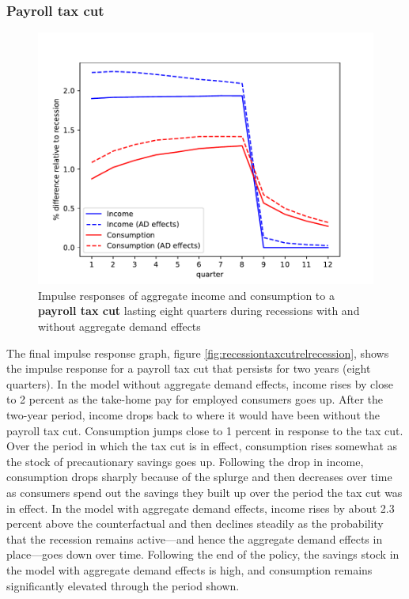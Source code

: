 \documentclass[\econtexRoot/HAFiscal]{subfiles}
\begin{document}
\subsubsection{Payroll tax cut}

\begin{figure}
  \centering
  \includegraphics[width=0.8\linewidth]{Code/HA-Models/FromPandemicCode/Figures/recession_taxcut_relrecession}
  \caption{Impulse responses of aggregate income and consumption to a \textbf{payroll tax cut} lasting eight quarters during recessions with and without aggregate demand effects}
  \notinsubfile{\label{fig:recessiontaxcutrelrecession}}
\end{figure}

The final impulse response graph, figure \ref{fig:recessiontaxcutrelrecession}, shows the impulse response for a payroll tax cut that persists for two years (eight quarters). In the model without aggregate demand effects, income rises by close to 2 percent as the take-home pay for employed consumers goes up. After the two-year period, income drops back to where it would have been without the payroll tax cut. Consumption jumps close to 1 percent in response to the tax cut. Over the period in which the tax cut is in effect, consumption rises somewhat as the stock of precautionary savings goes up. Following the drop in income, consumption drops sharply because of the splurge and then decreases over time as consumers spend out the savings they built up over the period the tax cut was in effect. In the model with aggregate demand effects, income rises by about 2.3 percent above the counterfactual and then declines steadily as the probability that the recession remains active---and hence the aggregate demand effects in place---goes down over time. Following the end of the policy, the savings stock in the model with aggregate demand effects is high, and consumption remains significantly elevated through the period shown.
\end{document}
